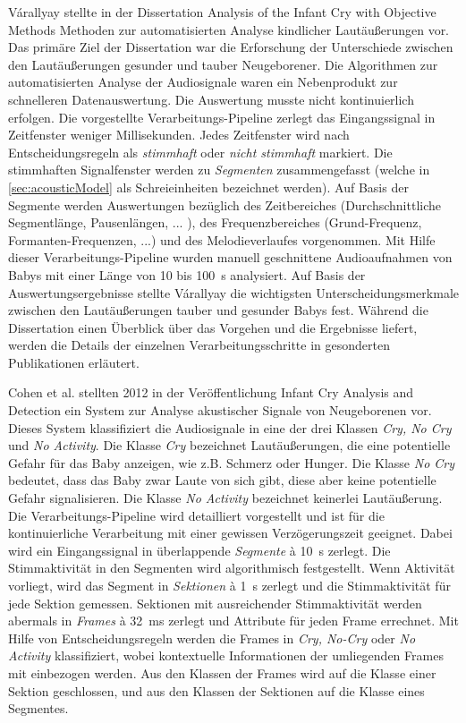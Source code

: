 Várallyay stellte in der Dissertation \glqq Analysis of the Infant Cry with Objective Methods\grqq{} \cite{cry_thesis} Methoden zur automatisierten Analyse kindlicher Lautäußerungen vor. Das primäre Ziel der Dissertation war die Erforschung der Unterschiede zwischen den Lautäußerungen gesunder und tauber Neugeborener. Die Algorithmen zur automatisierten Analyse der Audiosignale waren ein \glqq Nebenprodukt\grqq{} zur schnelleren Datenauswertung. Die Auswertung musste nicht kontinuierlich erfolgen. Die vorgestellte Verarbeitungs-Pipeline zerlegt das Eingangssignal in Zeitfenster weniger Millisekunden. Jedes Zeitfenster wird nach Entscheidungsregeln als \emph{stimmhaft} oder \emph{nicht stimmhaft} markiert. Die stimmhaften Signalfenster werden zu \emph{Segmenten} zusammengefasst (welche in \autoref{sec:acousticModel} als Schreieinheiten bezeichnet werden). Auf Basis der Segmente werden Auswertungen bezüglich des Zeitbereiches (Durchschnittliche Segmentlänge, Pausenlängen, ... ), des Frequenzbereiches (Grund-Frequenz, Formanten-Frequenzen, ...) und des Melodieverlaufes vorgenommen. Mit Hilfe dieser Verarbeitungs-Pipeline wurden manuell geschnittene Audioaufnahmen von Babys mit einer Länge von 10 bis \SI{100}{\second} analysiert. Auf Basis der Auswertungsergebnisse stellte Várallyay die wichtigsten Unterscheidungsmerkmale zwischen den Lautäußerungen tauber und gesunder Babys fest. Während die Dissertation \cite{cry_thesis} einen Überblick über das Vorgehen und die Ergebnisse liefert, werden die Details der einzelnen Verarbeitungsschritte in gesonderten Publikationen erläutert.

Cohen et al. stellten 2012 in der Veröffentlichung \glqq Infant Cry Analysis and Detection\grqq{} \cite{cohenCry}  ein System zur Analyse akustischer Signale von Neugeborenen vor. Dieses System klassifiziert die Audiosignale in eine der drei Klassen \emph{Cry, No Cry} und \emph{No Activity}. Die Klasse \emph{Cry} bezeichnet Lautäußerungen, die eine potentielle Gefahr für das Baby anzeigen, wie z.B. Schmerz oder Hunger. Die Klasse \emph{No Cry} bedeutet, dass das Baby zwar Laute von sich gibt, diese aber keine potentielle Gefahr signalisieren. Die Klasse \emph{No Activity} bezeichnet keinerlei Lautäußerung. Die Verarbeitungs-Pipeline wird detailliert vorgestellt und ist für die kontinuierliche Verarbeitung mit einer gewissen Verzögerungszeit geeignet. Dabei wird ein Eingangssignal in überlappende \emph{Segmente} \`{a} \SI{10}{\second} zerlegt. Die Stimmaktivität in den Segmenten wird algorithmisch festgestellt. Wenn Aktivität vorliegt, wird das Segment in \emph{Sektionen} \`{a} \SI{1}{\second} zerlegt und die Stimmaktivität für jede Sektion gemessen. Sektionen mit ausreichender Stimmaktivität werden abermals in \emph{Frames} \`{a} \SI{32}{\milli\second} zerlegt und Attribute für jeden Frame errechnet. Mit Hilfe von Entscheidungsregeln werden die Frames in \emph{Cry, No-Cry} oder \emph{No Activity} klassifiziert, wobei kontextuelle Informationen der umliegenden Frames mit einbezogen werden. Aus den Klassen der Frames wird auf die Klasse einer Sektion geschlossen, und aus den Klassen der Sektionen auf die Klasse eines Segmentes. 

